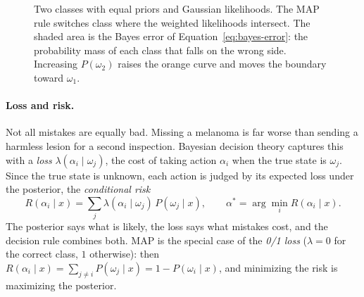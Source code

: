 \begin{figure}[!htb]
  \centering
  \caption{Two classes with equal priors and Gaussian likelihoods. The MAP rule
  switches class where the weighted likelihoods intersect. The shaded area is
  the Bayes error of Equation~\eqref{eq:bayes-error}: the probability mass of
  each class that falls on the wrong side. Increasing $P(\omega_2)$ raises the
  orange curve and moves the boundary toward $\omega_1$.}
  \label{fig:bayes-error}
\end{figure}

\paragraph{Loss and risk.}
Not all mistakes are equally bad. Missing a melanoma is far worse than sending a
harmless lesion for a second inspection. Bayesian decision theory captures this
with a \emph{loss} $\lambda(\alpha_i\mid\omega_j)$, the cost of taking action
$\alpha_i$ when the true state is $\omega_j$. Since the true state is unknown,
each action is judged by its expected loss under the posterior, the
\emph{conditional risk}
\begin{equation}
  R(\alpha_i\mid x) = \sum_{j} \lambda(\alpha_i\mid\omega_j)\,P(\omega_j\mid x),
  \qquad
  \alpha^* = \arg\min_{i} R(\alpha_i\mid x).
  \label{eq:risk}
\end{equation}
\noindent
The posterior says what is likely, the loss says what mistakes cost, and the
decision rule combines both. MAP is the special case of the \emph{0/1 loss}
($\lambda = 0$ for the correct class, $1$ otherwise): then
$R(\alpha_i\mid x) = \sum_{j\ne i}P(\omega_j\mid x) = 1 - P(\omega_i\mid x)$, and
minimizing the risk is maximizing the posterior.

